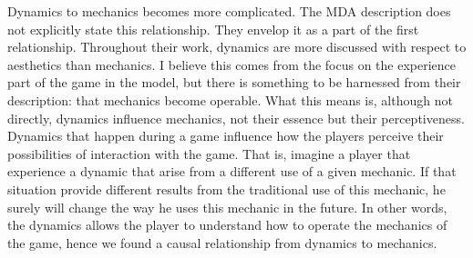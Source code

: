 Dynamics to mechanics becomes more complicated. The MDA description does not explicitly state this relationship. They envelop it as a part of the first relationship. Throughout their work, dynamics are more discussed with respect to aesthetics than mechanics. I believe this comes from the focus on the experience part of the game in the model, but there is something to be harnessed from their description: that mechanics become operable. What this means is, although not directly, dynamics influence mechanics, not their essence but their perceptiveness. Dynamics that happen during a game influence how the players perceive their possibilities of interaction with the game. That is, imagine a player that experience a dynamic that arise from a different use of a given mechanic. If that situation provide different results from the traditional use of this mechanic, he surely will change the way he uses this mechanic in the future. In other words, the dynamics allows the player to understand how to operate the mechanics of the game, hence we found a causal relationship from dynamics to mechanics.


